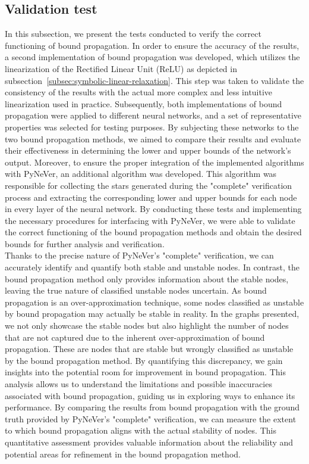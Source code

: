 \subsection{Validation test}
In this subsection, we present the tests conducted to verify the correct functioning of bound propagation.
In order to ensure the accuracy of the results, a second implementation of bound propagation was developed, which utilizes the linearization of the Rectified Linear Unit (ReLU) as depicted in subsection~\ref{subsec:symbolic-linear-relaxation}. 
This step was taken to validate the consistency of the results with the actual more complex and less intuitive linearization used in practice.
Subsequently, both implementations of bound propagation were applied to different neural networks, and a set of representative properties was selected for testing purposes. 
By subjecting these networks to the two bound propagation methods, we aimed to compare their results and evaluate their effectiveness in determining the lower and upper bounds of the network's output.
Moreover, to ensure the proper integration of the implemented algorithms with PyNeVer, an additional algorithm was developed. 
This algorithm was responsible for collecting the stars generated during the "complete" verification process and extracting the corresponding lower and upper bounds for each node in every layer of the neural network.
By conducting these tests and implementing the necessary procedures for interfacing with PyNeVer, we were able to validate the correct functioning of the bound propagation methods and obtain the desired bounds for further analysis and verification.\\

Thanks to the precise nature of PyNeVer's "complete" verification, we can accurately identify and quantify both stable and unstable nodes. In contrast, the bound propagation method only provides information about the stable nodes, leaving the true nature of classified unstable nodes uncertain. 
As bound propagation is an over-approximation technique, some nodes classified as unstable by bound propagation may actually be stable in reality.
In the graphs presented, we not only showcase the stable nodes but also highlight the number of nodes that are not captured due to the inherent over-approximation of bound propagation. These are nodes 
that are stable but wrongly classified as unstable by the bound propagation method. By quantifying this discrepancy, we gain insights into the potential room for improvement in bound propagation.
This analysis allows us to understand the limitations and possible inaccuracies associated with bound propagation, guiding us in exploring ways to enhance its performance. 
By comparing the results from bound propagation with the ground truth provided by PyNeVer's "complete" verification, we can measure the extent to which bound propagation aligns with the actual stability of nodes. 
This quantitative assessment provides valuable information about the reliability and potential areas for refinement in the bound propagation method.

